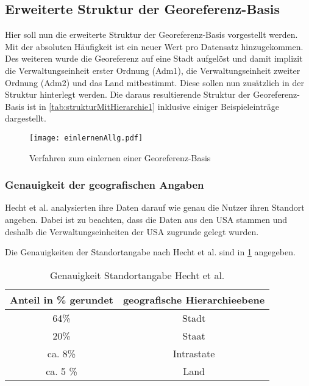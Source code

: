 	
		\subsection{Erweiterte Struktur der Georeferenz-Basis} \label{subsec:erweiterteStruktur} 

			Hier soll nun die erweiterte Struktur der Georeferenz-Basis vorgestellt werden.
			Mit der absoluten Häufigkeit ist ein neuer Wert pro Datensatz hinzugekommen.
			Des weiteren wurde die Georeferenz auf eine Stadt aufgelöst und damit implizit die Verwaltungseinheit erster Ordnung (Adm1), die Verwaltungseinheit zweiter Ordnung (Adm2) und das Land mitbestimmt. 
			Diese sollen nun zusätzlich in der Struktur hinterlegt werden.
			Die daraus resultierende Struktur der Georeferenz-Basis ist in \ref{tab:strukturMitHierarchie1} inklusive einiger Beispieleinträge dargestellt.


				\begin{figure}[!ht]
					\begin{center}
						\texttt{[image: einlernenAllg.pdf]}
						\caption{Verfahren zum einlernen einer Georeferenz-Basis}
						\label{img:EinlernenAllg}
					\end{center}
			\end{figure}


			

\subsubsection{Genauigkeit der geografischen Angaben}
				
				Hecht et al. analysierten ihre Daten darauf wie genau die Nutzer ihren Standort angeben.
				Dabei ist zu beachten, dass die Daten aus den USA stammen und deshalb die Verwaltungseinheiten der USA zugrunde gelegt wurden.
				
				Die Genauigkeiten der Standortangabe nach Hecht et al. sind in \ref{tab:genauigkeitenHecht} angegeben. 

				\begin{table}[htpb]
				\caption{Genauigkeit Standortangabe Hecht et al.} 
				\centering
				\begin{tabular}{|c||c|}
					\hline
					Anteil in \% gerundet & geografische Hierarchieebene \\
					\hline\hline
					64\% & Stadt \\
					\hline
					20\% & Staat \\
					\hline
					ca. 8\% & Intrastate \\
					\hline
					ca. 5 \% & Land \\
					\hline
				\end{tabular}
				\label{tab:genauigkeitenHecht} 
				\end{table} 

